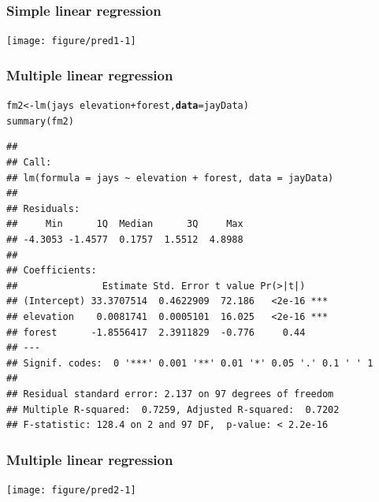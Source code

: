 \documentclass[color=usenames,dvipsnames]{beamer}\usepackage[]{graphicx}\usepackage[]{color}
\makeatletter
\newcommand{\hlopt}[1]{\textcolor[rgb]{0,0,0}{#1}}%
\newcommand{\hlstd}[1]{\textcolor[rgb]{0,0,0}{#1}}%
\newcommand{\hlkwb}[1]{\textcolor[rgb]{0,0.341,0.682}{#1}}%
\newcommand{\hlkwc}[1]{\textcolor[rgb]{0,0,0}{\textbf{#1}}}%
\newcommand{\hlkwd}[1]{\textcolor[rgb]{0.004,0.004,0.506}{#1}}%
\newenvironment{kframe}{%
 \def\at@end@of@kframe{}%
 \ifinner\ifhmode%
  \def\at@end@of@kframe{\end{minipage}}%
  \begin{minipage}{\columnwidth}%
 \fi\fi%
 \def\FrameCommand##1{\hskip\@totalleftmargin \hskip-\fboxsep
 \colorbox{shadecolor}{##1}\hskip-\fboxsep
     \hskip-\linewidth \hskip-\@totalleftmargin \hskip\columnwidth}%
 \MakeFramed {\advance\hsize-\width
   \@totalleftmargin\z@ \linewidth\hsize
   \@setminipage}}%
 {\par\unskip\endMakeFramed%
 \at@end@of@kframe}
\newenvironment{knitrout}{}{} %
\makeatother
\begin{document}
\begin{frame}[fragile]
  \frametitle{Simple linear regression}
\begin{knitrout}
\color{fgcolor}
\texttt{[image: figure/pred1-1]} 

\end{knitrout}
\end{frame}



\begin{frame}[fragile]
  \frametitle{Multiple linear regression}
\begin{knitrout}\scriptsize
{}\color{fgcolor}\begin{kframe}
\begin{alltt}
\hlstd{fm2} \hlkwb{<-} \hlkwd{lm}\hlstd{(jays} \hlopt{~} \hlstd{elevation}\hlopt{+}\hlstd{forest,} \hlkwc{data}\hlstd{=jayData)}
\hlkwd{summary}\hlstd{(fm2)}
\end{alltt}
\begin{verbatim}
## 
## Call:
## lm(formula = jays ~ elevation + forest, data = jayData)
## 
## Residuals:
##     Min      1Q  Median      3Q     Max 
## -4.3053 -1.4577  0.1757  1.5512  4.8988 
## 
## Coefficients:
##               Estimate Std. Error t value Pr(>|t|)    
## (Intercept) 33.3707514  0.4622909  72.186   <2e-16 ***
## elevation    0.0081741  0.0005101  16.025   <2e-16 ***
## forest      -1.8556417  2.3911829  -0.776     0.44    
## ---
## Signif. codes:  0 '***' 0.001 '**' 0.01 '*' 0.05 '.' 0.1 ' ' 1
## 
## Residual standard error: 2.137 on 97 degrees of freedom
## Multiple R-squared:  0.7259,	Adjusted R-squared:  0.7202 
## F-statistic: 128.4 on 2 and 97 DF,  p-value: < 2.2e-16
\end{verbatim}
\end{kframe}
\end{knitrout}
\end{frame}




\begin{frame}[fragile]
  \frametitle{Multiple linear regression}
\begin{knitrout}
\color{fgcolor}
\texttt{[image: figure/pred2-1]} 

\end{knitrout}
\end{frame}
\end{document}
